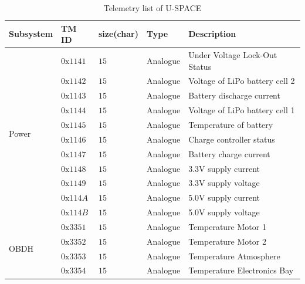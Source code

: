 \begin{table}[bht]
\centering
\caption[Telemetry list of the U-SPACE]{Telemetry list of \ac{U-SPACE}}
\label{tab:telemetry_uspace}
\begin{tabular}{|m{}m{}m{}m{}m{}|}
\hline
\textbf{Subsystem}		&  		\textbf{TM ID}				&	\textbf{size(char)}			&	\textbf{Type}& 		\textbf{Description}  			  \\ 
\hline\hline
\multirow{11}{*}{Power} &    $ 0\text{x}1141 $				&	$ 15 $						&    Analogue    &    	Under Voltage Lock-Out Status     \\
						&    $ 0\text{x}1142 $				& 	$ 15 $						& 	 Analogue	 &	 	Voltage of LiPo battery cell 2    \\
						&    $ 0\text{x}1143 $				&   $ 15 $						& 	 Analogue	 &	 	Battery discharge current  		  \\
						&    $ 0\text{x}1144 $				& 	$ 15 $						&	 Analogue	 &		Voltage of LiPo battery cell 1    \\
						&    $ 0\text{x}1145 $				& 	$ 15 $						&	 Analogue	 &		Temperature of battery  	  	  \\
						&    $ 0\text{x}1146 $				&   $ 15 $						&	 Analogue	 &		Charge controller status  	 	  \\
						&    $ 0\text{x}1147 $				&   $ 15 $						&	 Analogue	 &		Battery charge current  	  	  \\
						&    $ 0\text{x}1148 $				&   $ 15 $						&	 Analogue	 &		3.3V supply current  		 	  \\
						&    $ 0\text{x}1149 $				&   $ 15 $						&	 Analogue	 &		3.3V supply voltage  		      \\
						&    $ 0\text{x}114A $				&   $ 15 $						&	 Analogue	 &		5.0V supply current 	    	  \\
						&    $ 0\text{x}114B $				&   $ 15 $						&	 Analogue	 &		5.0V supply voltage  		 	  \\
\hline
\multirow{5}{*}{OBDH}   &    $ 0\text{x}3351 $				&	$ 15 $						&	 Analogue	 &      Temperature Motor 1			      \\
						&    $ 0\text{x}3352 $				&	$ 15 $						&	 Analogue	 &      Temperature Motor 2	   		      \\
						&    $ 0\text{x}3353 $				&	$ 15 $						&	 Analogue	 &      Temperature Atmosphere		      \\
						&    $ 0\text{x}3354 $				&	$ 15 $						&	 Analogue	 &      Temperature Electronics Bay	      \\

\end{tabular}
\end{table}
